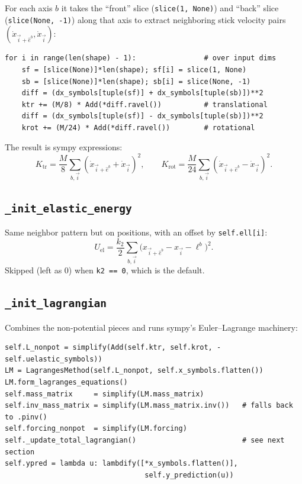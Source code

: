 \documentclass[11pt]{article}
\newcommand{\code}[1]{\texttt{\small #1}}
\begin{document}
For each axis $b$ it takes the ``front'' slice (\code{slice(1, None)}) and ``back'' slice (\code{slice(None, -1)}) along that axis to extract neighboring stick velocity pairs $(\dot x_{\vec i + \hat e^b}, \dot x_{\vec i})$:

\begin{lstlisting}
for i in range(len(shape) - 1):                # over input dims
    sf = [slice(None)]*len(shape); sf[i] = slice(1, None)
    sb = [slice(None)]*len(shape); sb[i] = slice(None, -1)
    diff = (dx_symbols[tuple(sf)] + dx_symbols[tuple(sb)])**2
    ktr += (M/8) * Add(*diff.ravel())          # translational
    diff = (dx_symbols[tuple(sf)] - dx_symbols[tuple(sb)])**2
    krot += (M/24) * Add(*diff.ravel())        # rotational
\end{lstlisting}

The result is sympy expressions:
\[
K_\text{tr} = \frac{M}{8}\sum_{b,\vec i}(\dot x_{\vec i+\hat e^b} + \dot x_{\vec i})^2,
\qquad
K_\text{rot} = \frac{M}{24}\sum_{b,\vec i}(\dot x_{\vec i+\hat e^b} - \dot x_{\vec i})^2.
\]

\subsection*{\texttt{\_init\_elastic\_energy}}

Same neighbor pattern but on positions, with an offset by \code{self.ell[i]}:
\[
U_\text{el} = \frac{k_2}{2}\sum_{b,\vec i}\bigl(x_{\vec i+\hat e^b} - x_{\vec i} - \ell^b\bigr)^2.
\]
Skipped (left as $0$) when \code{k2 == 0}, which is the default.

\subsection*{\texttt{\_init\_lagrangian}}

Combines the non-potential pieces and runs sympy's Euler--Lagrange machinery:

\begin{lstlisting}
self.L_nonpot = simplify(Add(self.ktr, self.krot, -self.uelastic_symbols))
LM = LagrangesMethod(self.L_nonpot, self.x_symbols.flatten())
LM.form_lagranges_equations()
self.mass_matrix     = simplify(LM.mass_matrix)
self.inv_mass_matrix = simplify(LM.mass_matrix.inv())   # falls back to .pinv()
self.forcing_nonpot  = simplify(LM.forcing)
self._update_total_lagrangian()                         # see next section
self.ypred = lambda u: lambdify([*x_symbols.flatten()],
                                 self.y_prediction(u))
\end{lstlisting}
\end{document}
